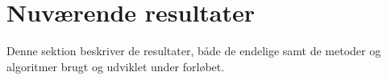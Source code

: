 \section{Nuværende resultater}

Denne sektion beskriver de resultater, både de endelige samt de metoder og algoritmer brugt og udviklet under forløbet.

\subsection{}

